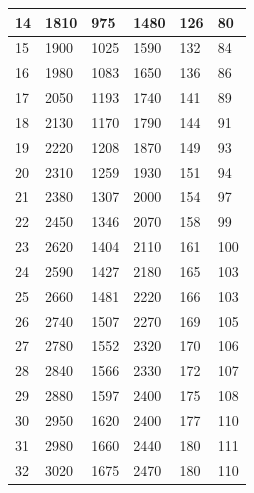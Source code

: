 \documentclass[a4paper]{ltxdoc}
\begin{document}
{\begin{longtable}{|l|l|l|l|l|l|}
        14  & 1810          & 975           & 1480          & 126           & 80            \\ \hline
        15  & 1900          & 1025          & 1590          & 132           & 84            \\ \hline
        16  & 1980          & 1083          & 1650          & 136           & 86            \\ \hline
        17  & 2050          & 1193          & 1740          & 141           & 89            \\ \hline
        18  & 2130          & 1170          & 1790          & 144           & 91            \\ \hline
        19  & 2220          & 1208          & 1870          & 149           & 93            \\ \hline
        20  & 2310          & 1259          & 1930          & 151           & 94            \\ \hline
        21  & 2380          & 1307          & 2000          & 154           & 97            \\ \hline
        22  & 2450          & 1346          & 2070          & 158           & 99            \\ \hline
        23  & 2620          & 1404          & 2110          & 161           & 100           \\ \hline
        24  & 2590          & 1427          & 2180          & 165           & 103           \\ \hline
        25  & 2660          & 1481          & 2220          & 166           & 103           \\ \hline
        26  & 2740          & 1507          & 2270          & 169           & 105           \\ \hline
        27  & 2780          & 1552          & 2320          & 170           & 106           \\ \hline
        28  & 2840          & 1566          & 2330          & 172           & 107           \\ \hline
        29  & 2880          & 1597          & 2400          & 175           & 108           \\ \hline
        30  & 2950          & 1620          & 2400          & 177           & 110           \\ \hline
        31  & 2980          & 1660          & 2440          & 180           & 111           \\ \hline
        32  & 3020          & 1675          & 2470          & 180           & 110           \\ \hline

\end{longtable}}
\end{document}
